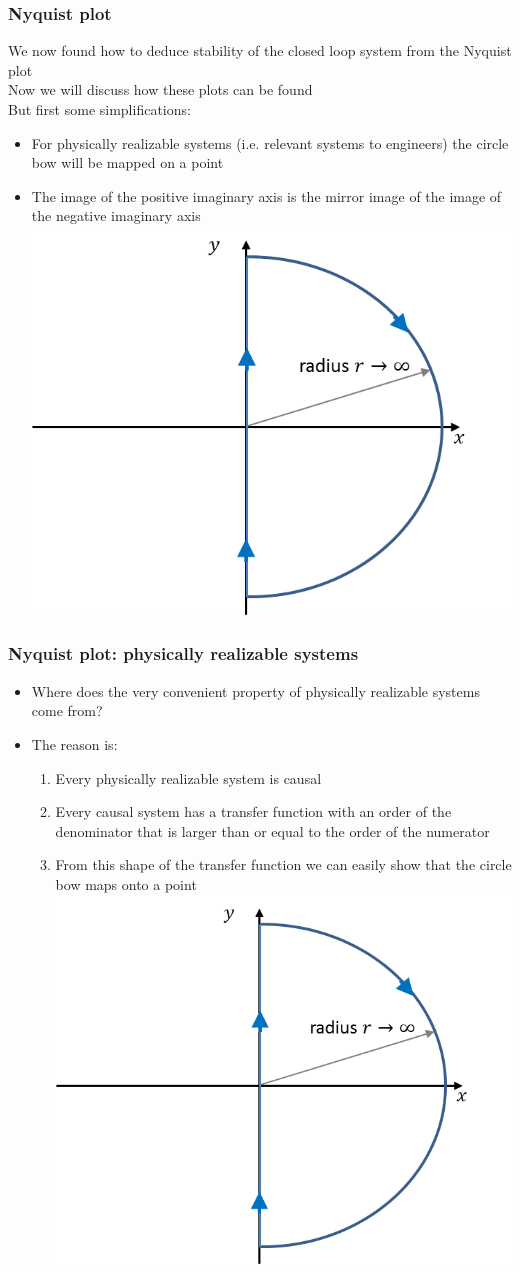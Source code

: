 \begin{frame}
\frametitle{Nyquist plot }
We now found how to deduce stability of the closed loop system from the Nyquist plot
\\
Now we will discuss how these plots can be found
\\
But first some simplifications:
\begin{itemize}
\item For physically realizable systems (i.e. relevant systems to engineers) the circle bow will be mapped on a point
\item The image of the positive imaginary axis is the mirror image of the image of the negative imaginary axis
\\ \includegraphics[width=0.5
\linewidth]{Afbeelding8}
\end{itemize}
\end{frame}

\begin{frame}
\frametitle{Nyquist plot: physically realizable systems}
\begin{itemize}
\item Where does the very convenient property of physically realizable systems come from?
\item The reason is:\begin{enumerate}
\item Every physically realizable system is causal
\item Every causal system has a transfer function with an order of the denominator that is larger than or equal to the order of the numerator
\item From this shape of the transfer function we can easily show that the circle bow maps onto a point
\\ \includegraphics[width=0.5
\linewidth]{Afbeelding8}
\end{enumerate}
\end{itemize}
\end{frame}


